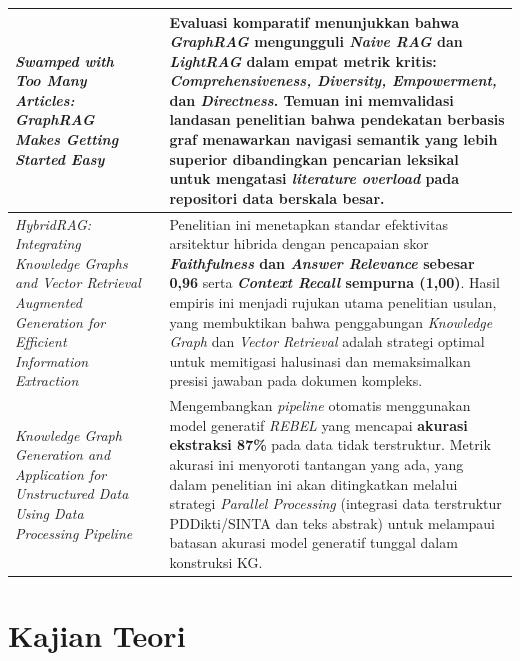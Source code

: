 \begin{longtable}{|p{4cm}|p{2cm}|p{10cm}|}
    \textit{Swamped with Too Many Articles: GraphRAG Makes Getting Started Easy}                                                    &
    \cite{Ngangmeni2025SwampedWT}                                                                                                   &
    Evaluasi komparatif menunjukkan bahwa \textit{GraphRAG} mengungguli \textit{Naive RAG} dan \textit{LightRAG} dalam empat metrik kritis: \textbf{\textit{Comprehensiveness, Diversity, Empowerment,}} dan \textbf{\textit{Directness}}. Temuan ini memvalidasi landasan penelitian bahwa pendekatan berbasis graf menawarkan navigasi semantik yang lebih superior dibandingkan pencarian leksikal untuk mengatasi \textit{literature overload} pada repositori data berskala besar.
    \\ \hline
    \textit{HybridRAG: Integrating Knowledge Graphs and Vector Retrieval Augmented Generation for Efficient Information Extraction} &
    \cite{10.1145/3677052.3698671}                                                                                                  &
    Penelitian ini menetapkan standar efektivitas arsitektur hibrida dengan pencapaian skor \textbf{\textit{Faithfulness} dan \textit{Answer Relevance} sebesar 0,96} serta \textbf{\textit{Context Recall} sempurna (1,00)}. Hasil empiris ini menjadi rujukan utama penelitian usulan, yang membuktikan bahwa penggabungan \textit{Knowledge Graph} dan \textit{Vector Retrieval} adalah strategi optimal untuk memitigasi halusinasi dan memaksimalkan presisi jawaban pada dokumen kompleks.
    \\ \hline
    \textit{Knowledge Graph Generation and Application for Unstructured Data Using Data Processing Pipeline}                        &
    \cite{thushara2024}                                                                                                             &
    Mengembangkan \textit{pipeline} otomatis menggunakan model generatif \textit{REBEL} yang mencapai \textbf{akurasi ekstraksi 87\%} pada data tidak terstruktur. Metrik akurasi ini menyoroti tantangan yang ada, yang dalam penelitian ini akan ditingkatkan melalui strategi \textit{Parallel Processing} (integrasi data terstruktur PDDikti/SINTA dan teks abstrak) untuk melampaui batasan akurasi model generatif tunggal dalam konstruksi KG.
    \\ \hline
\end{longtable}

\section{Kajian Teori}

